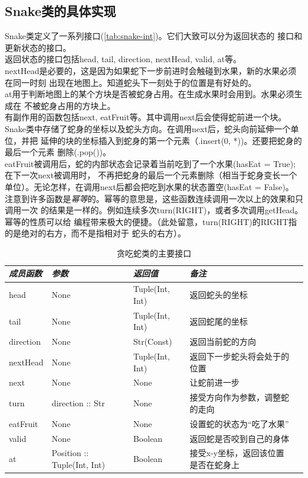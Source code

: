 \documentclass[a4paper]{article}
\begin{document}
\subsection{Snake类的具体实现}
Snake类定义了一系列接口(\autoref{tab:snake-int})。它们大致可以分为返回状态的
接口和更新状态的接口。\\

返回状态的接口包括head, tail, direction, nextHead, valid, at等。\\

nextHead是必要的，这是因为如果蛇下一步前进时会触碰到水果，新的水果必须在同一时刻
出现在地图上。知道蛇头下一刻处于的位置是有好处的。\\

at用于判断地图上的某个方块是否被蛇身占用。在生成水果时会用到。水果必须生成在
不被蛇身占用的方块上。 \\

有副作用的函数包括next, eatFruit等。其中调用next后会使得蛇前进一个块。
Snake类中存储了蛇身的坐标以及蛇头方向。在调用next后，蛇头向前延伸一个单位，并把
延伸的块的坐标插入到蛇身的第一个元素（.insert(0, *))。还要把蛇身的最后一个元素
删除(.pop())。\\

eatFruit被调用后，蛇的内部状态会记录着当前吃到了一个水果(hasEat = True);在下一次next被调用时，
不再把蛇身的最后一个元素删除（相当于蛇身变长一个单位）。无论怎样，在调用next后都会把吃到水果的状态置空(hasEat = False)。\\

注意到许多函数是\emph{幂等}的。幂等的意思是，这些函数连续调用一次以上的效果和只调用一次
的结果是一样的。例如连续多次turn(RIGHT)，或者多次调用getHead。幂等的性质可以给
编程带来极大的便捷。（此处留意，turn(RIGHT)的RIGHT指的是绝对的右方，而不是指相对于
蛇头的右方）。


\begin{table}[!htb]
\caption{贪吃蛇类的主要接口}\label{tab:snake-int}
\centering
\begin{tabular}{@{} *5l @{}}
    \toprule
\emph{成员函数} & \emph{参数} & \emph{返回值} & \emph{备注} & \\
    \midrule
    head & None & Tuple(Int, Int) & 返回蛇头的坐标  \\
    tail & None & Tuple(Int, Int) & 返回蛇尾的坐标 \\
    direction & None & Str(Const) & 返回当前蛇的方向 \\
    nextHead & None & Tuple(Int, Int) & 返回下一步蛇头将会处于的位置 \\
    next &  None & None & 让蛇前进一步 \\
    turn & direction :: Str & None & 接受方向作为参数，调整蛇的走向 \\
    eatFruit & None &  None & 设置蛇的状态为``吃了水果'' \\
    valid & None & Boolean & 返回蛇是否咬到自己的身体 \\
    at & Position :: Tuple(Int, Int) & Boolean & 接受x-y坐标，返回该位置是否在蛇身上
    \\
    \bottomrule
\hline
\end{tabular}
\end{table}
\end{document}
